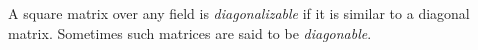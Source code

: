 \documentclass[12pt]{article}
\begin{document}
A square matrix over any field is {\it diagonalizable} if it is similar to
a diagonal matrix. Sometimes such matrices are said to be {\it diagonable}.
\end{document}
